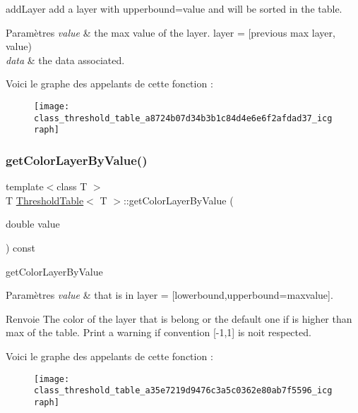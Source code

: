 add\+Layer add a layer with upperbound=value and will be sorted in the table. 


\begin{DoxyParams}{Paramètres}
{\em value} & the max value of the layer. layer = \mbox{[}previous max layer, value) \\
\hline
{\em data} & the data associated. \\
\hline
\end{DoxyParams}
Voici le graphe des appelants de cette fonction \+:\nopagebreak
\begin{figure}[H]
\begin{center}
\leavevmode
\texttt{[image: class\_threshold\_table\_a8724b07d34b3b1c84d4e6e6f2afdad37\_icgraph]}
\end{center}
\end{figure}
\mbox{\label{class_threshold_table_a35e7219d9476c3a5c0362e80ab7f5596}} 
\subsubsection{\texorpdfstring{get\+Color\+Layer\+By\+Value()}{getColorLayerByValue()}}
{\footnotesize\ttfamily template$<$class T $>$ \\
T \hyperlink{class_threshold_table}{Threshold\+Table}$<$ T $>$\+::get\+Color\+Layer\+By\+Value (\begin{DoxyParamCaption}\item[{double}]{value }\end{DoxyParamCaption}) const\hspace{0.3cm}{\ttfamily [inline]}}



get\+Color\+Layer\+By\+Value 


\begin{DoxyParams}{Paramètres}
{\em value} & that is in layer = \mbox{[}lowerbound,upperbound=maxvalue\mbox{]}. \\
\hline
\end{DoxyParams}
\begin{DoxyReturn}{Renvoie}
The color of the layer that is belong or the default one if is higher than max of the table. Print a warning if convention \mbox{[}-\/1,1\mbox{]} is noit respected. 
\end{DoxyReturn}
Voici le graphe des appelants de cette fonction \+:\nopagebreak
\begin{figure}[H]
\begin{center}
\leavevmode
\texttt{[image: class\_threshold\_table\_a35e7219d9476c3a5c0362e80ab7f5596\_icgraph]}
\end{center}
\end{figure}
\mbox{\label{class_threshold_table_ac20ccb2dd4cd20e96036818ca0106f93}} 
